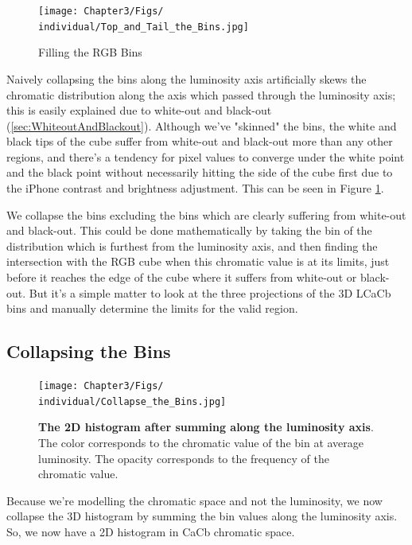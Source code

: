 \begin{figure}[h!] %
  \centering
    \texttt{[image: Chapter3/Figs/\\individual/Top\_and\_Tail\_the\_Bins.jpg]}
        \caption{Filling the RGB Bins}  \label{fig:Top_and_Tail_the_Bins}
    \end{figure}


Naively collapsing the bins along the luminosity axis artificially skews the chromatic distribution along the axis which passed through the luminosity axis; this is easily explained due to white-out and black-out (\ref{sec:WhiteoutAndBlackout}). 
Although we've "skinned" the bins, the white and black tips of the cube suffer from white-out and black-out more than any other regions, and there's a tendency for pixel values to converge under the white point and the black point without necessarily hitting the side of the cube first due to the iPhone contrast and brightness adjustment. This can be seen in Figure   \ref{fig:Top_and_Tail_the_Bins}. 

We collapse the bins excluding the bins which are clearly suffering from white-out and black-out. This could be done mathematically by taking the bin of the distribution which is furthest from the luminosity axis, and then finding the intersection with the RGB cube when this chromatic value is at its limits, just before it reaches the edge of the cube where it suffers from white-out or black-out. But it's a simple matter to look at the three projections of the 3D LCaCb bins and manually determine the limits for the valid region.


\subsection{Collapsing the Bins}\label{sec:CollapsingTheBins}

\begin{figure}[h!]
  \centering
    \texttt{[image: Chapter3/Figs/\\individual/Collapse\_the\_Bins.jpg]}
        \caption{\textbf{The 2D histogram after summing along the luminosity axis}. The color corresponds to the chromatic value of the bin at average luminosity. The opacity corresponds to the frequency of the chromatic value. }  \label{fig:Collapse_the_Bins}
    \end{figure}
    
Because we're modelling the chromatic space and not the luminosity, we now collapse the 3D histogram by summing the bin values along the luminosity axis. So, we now have a 2D histogram in CaCb chromatic space.





